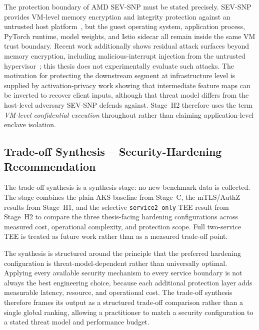 The protection boundary of AMD SEV-SNP must be stated precisely.
SEV-SNP provides VM-level memory encryption and integrity protection against an
untrusted host platform~\cite{amd_sevsnp_whitepaper,kaplan2023_hardware_vm}, but the
guest operating system, application process, PyTorch runtime, model weights, and Istio
sidecar all remain inside the same VM trust boundary. Recent work additionally shows residual attack surfaces beyond
memory encryption, including malicious-interrupt injection from the untrusted
hypervisor~\cite{schluter2024_heckler}; this thesis does not experimentally
evaluate such attacks. The motivation for protecting the downstream segment at
infrastructure level is supplied by activation-privacy work
\cite{he2021_attacking_collaborative} showing that intermediate feature maps
can be inverted to recover client inputs, although that threat model differs
from the host-level adversary SEV-SNP defends against. Stage~H2 therefore uses the
term \emph{VM-level confidential execution} throughout rather than claiming
application-level enclave isolation.

\subsection{Trade-off Synthesis -- Security-Hardening Recommendation}
\label{sec:methods-rq23}

The trade-off synthesis is a synthesis stage: no new benchmark data is collected.
The stage combines the plain AKS baseline from Stage~C, the mTLS/AuthZ results from
Stage~H1, and the selective \texttt{service2\_only} TEE result from Stage~H2 to compare
the three thesis-facing hardening configurations across measured cost,
operational complexity, and protection scope. Full two-service TEE is treated
as future work rather than as a measured trade-off point.

The synthesis is structured around the principle that the preferred hardening
configuration is threat-model-dependent rather than universally optimal.
Applying every available security mechanism to every service boundary is not always the
best engineering choice, because each additional protection layer adds measurable
latency, resource, and operational cost.
The trade-off synthesis therefore frames its output as a structured trade-off comparison rather than a
single global ranking, allowing a practitioner to match a security configuration to a
stated threat model and performance budget.

